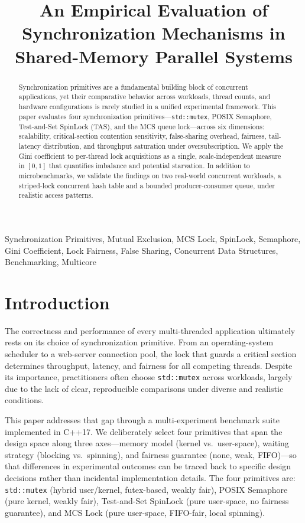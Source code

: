\documentclass[conference]{IEEEtran}
\title{An Empirical Evaluation of Synchronization Mechanisms in Shared-Memory Parallel Systems}
\author{
\IEEEauthorblockN{Pasupuleti T A N S V Vignesh}
\IEEEauthorblockA{\textit{IIIT-Bangalore}\\
IMT2023003}
\and
\IEEEauthorblockN{Kunda Sri Krishna Chaitanya}
\IEEEauthorblockA{\textit{IIIT-Bangalore}\\
IMT2023039}

}
\begin{document}
\maketitle

\begin{abstract}
Synchronization primitives are a fundamental building block of concurrent applications, yet their comparative behavior across workloads, thread counts, and hardware configurations is rarely studied in a unified experimental framework. This paper evaluates four synchronization primitives---\texttt{std::mutex}, POSIX Semaphore, Test-and-Set SpinLock (TAS), and the MCS queue lock---across six dimensions: scalability, critical-section contention sensitivity, false-sharing overhead, fairness, tail-latency distribution, and throughput saturation under oversubscription. We apply the Gini coefficient to per-thread lock acquisitions as a single, scale-independent measure in $[0,1]$ that quantifies imbalance and potential starvation. In addition to microbenchmarks, we validate the findings on two real-world concurrent workloads, a striped-lock concurrent hash table and a bounded producer-consumer queue, under realistic access patterns.

\end{abstract}

\begin{IEEEkeywords}
Synchronization Primitives, Mutual Exclusion, MCS Lock, SpinLock,
Semaphore, Gini Coefficient, Lock Fairness, False Sharing,
Concurrent Data Structures, Benchmarking, Multicore
\end{IEEEkeywords}

\section{Introduction}

The correctness and performance of every multi-threaded application ultimately rests on its choice of synchronization primitive. From an operating-system scheduler to a web-server connection pool, the lock that guards a critical section determines throughput, latency, and fairness for all competing threads. Despite its importance, practitioners often choose \texttt{std::mutex} across workloads, largely due to the lack of clear, reproducible comparisons under diverse and realistic conditions.

This paper addresses that gap through a multi-experiment benchmark suite implemented in C++17. We deliberately select four primitives that span the design space along three axes---memory model (kernel vs.\ user-space), waiting strategy (blocking vs.\ spinning), and fairness guarantee (none, weak, FIFO)---so that differences in experimental outcomes can be traced back to specific design decisions rather than incidental implementation details. The four primitives are: \texttt{std::mutex} (hybrid user/kernel, futex-based, weakly fair), POSIX Semaphore (pure kernel, weakly fair), Test-and-Set SpinLock (pure user-space, no fairness guarantee), and MCS Lock \cite{mellor1991algorithms} (pure user-space, FIFO-fair, local spinning).
\end{document}
